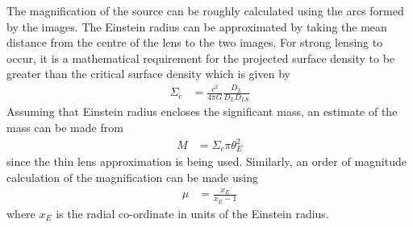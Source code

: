 	The magnification of the source can be roughly calculated using the arcs formed by the images. The Einstein radius can be approximated by taking the mean distance from the centre of the lens to the two images. For strong lensing to occur, it is a mathematical requirement for the projected surface density to be greater than the critical surface density which is given by \cite{Critical_surface_density}
	\begin{align}
		\Sigma_c &= \frac{c^2}{4\pi G}\frac{D_L}{D_L D_{LS}}
	\end{align}
	Assuming that Einstein radius encloses the significant mass, an estimate of the mass can be made from 
	\begin{align}
		M &= \Sigma_c \pi \theta_E^2
	\end{align}
	since the thin lens approximation is being used. Similarly, an order of magnitude calculation of the magnification can be made using 
	\begin{align}
		\mu &= \frac{x_E}{x_E -1}
	\end{align}
	where $x_E$ is the radial co-ordinate in units of the Einstein radius. \cite{Lens_mass_estimate}
